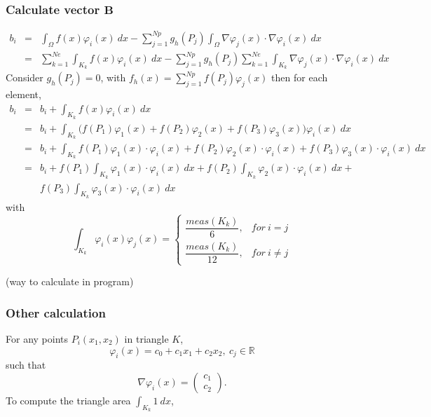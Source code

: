 \documentclass[a4paper,10pt]{article}
\begin{document}
\subsubsection{Calculate vector $ \mathbf{B} $}
\begin{eqnarray} \nonumber
b_{i} &=& \int_{\Omega} f(x) \varphi_{i}(x) \ dx - \sum_{j=1}^{Np} g_{h}(P_{j}) \int_{\Omega} \nabla \varphi_{j}(x) \cdot \nabla \varphi_{i}(x) \ dx \\ \nonumber
&=& \sum_{k=1}^{Ne} \int_{K_{k}} f(x) \varphi_{i}(x) \ dx - \sum_{j=1}^{Np} g_{h}(P_{j}) \sum_{k=1}^{Ne} \int_{K_{k}} \nabla \varphi_{j}(x) \cdot \nabla \varphi_{i}(x) \ dx
\end{eqnarray}
Consider $ g_{h}(P_{j}) = 0 $, with $ f_{h}(x) = \sum_{j=1}^{Np} f(P_{j})\varphi_{j}(x) $ then for each element,
\begin{eqnarray} \nonumber
b_{i} &=& b_{i} + \int_{K_{k}} f(x) \varphi_{i}(x) \ dx \\ \nonumber
&=& b_{i} + \int_{K_{k}} \Big( f(P_{1}) \varphi_{1}(x) + f(P_{2}) \varphi_{2}(x) + f(P_{3}) \varphi_{3}(x) \Big) \varphi_{i}(x) \ dx \\ \nonumber
&=& b_{i} + \int_{K_{k}} f(P_{1}) \varphi_{1}(x) \cdot \varphi_{i}(x) + f(P_{2}) \varphi_{2}(x) \cdot \varphi_{i}(x) + f(P_{3}) \varphi_{3}(x) \cdot \varphi_{i}(x) \ dx \\ \nonumber
&=& b_{i} + f(P_{1}) \int_{K_{k}} \varphi_{1}(x) \cdot \varphi_{i}(x) \ dx + f(P_{2}) \int_{K_{k}} \varphi_{2}(x) \cdot \varphi_{i}(x) \ dx + \\ \nonumber
& & f(P_{3}) \int_{K_{k}} \varphi_{3}(x) \cdot \varphi_{i}(x) \ dx
\end{eqnarray}
with
\[  \int_{K_{k}} \varphi_{i}(x) \varphi_{j}(x) = \begin{cases}
\dfrac{meas(K_{k})}{6}, & for \ i=j \\
\dfrac{meas(K_{k})}{12}, & for \ i \neq j 
\end{cases} \]


(way to calculate in program)

\subsubsection{Other calculation}
For any points $ P_{i}(x_{1},x_{2}) $ in triangle $ K $,
\[ \varphi_{i}(x) = c_{0} + c_{1}x_{1} +  c_{2}x_{2}, \ c_{j} \in \mathbb{R} \]
such that
\[ \nabla \varphi_{i}(x) = \begin{pmatrix}
c_{1} \\ c_{2}
\end{pmatrix}.  \]
To compute the triangle area $ \int_{K_{k}} 1 \ dx $,
\end{document}
